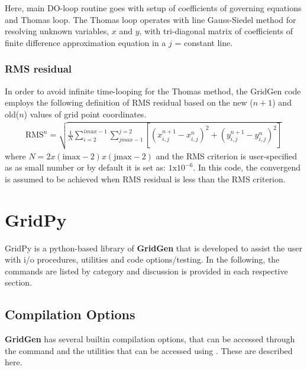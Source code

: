 \documentclass[letterpaper,10pt,english]{sphinxmanual}
\begin{document}
Here, main DO-loop routine goes with setup of coefficients of governing equations and Thomas loop. The Thomas loop operates with line Gauss-Siedel method for resolving unknown variables, \(x\) and \(y\), with tri-diagonal matrix of coefficients of finite difference approximation equation in a \(j\) = constant line.


\subsubsection{RMS residual}
\label{\detokenize{devel:rms-residual}}
In order to avoid infinite time-looping for the Thomas method, the GridGen code employs the following definition of RMS residual based on the new (\(n+1\)) and old(\(n\)) values of grid point coordinates.
\begin{equation*}
\begin{split}\text{RMS}^{n} = \sqrt{\frac{1}{N} \sum_{i=2}^{imax-1} \sum_{jmax-1}^{j=2} \left[\left(x_{i,j}^{n+1} - x_{i,j}^{n} \right)^{2} + \left(y_{i,j}^{n+1} - y_{i,j}^{n} \right)^{2} \right]}\end{split}
\end{equation*}
where \(N = 2x(\text{imax}-2) x (\text{jmax}-2)\) and the RMS criterion is user-specified as as small number or by default it is set as: \(1\text{x}10^{-6}\). In this code, the convergend is assumed to be achieved when RMS residual is less than the RMS criterion.


\section{GridPy}
\label{\detokenize{gridpy::doc}}\label{\detokenize{gridpy:gridpy}}
GridPy is a python-based library of {\color{red}\bfseries{}\textbar{}GridGen\textbar{}} that is developed to assist the user with i/o procedures, utilities and code options/testing. In the following, the commands are listed by category and discussion is provided in each respective section.


\subsection{Compilation Options}
\label{\detokenize{gridpyfiles/compile::doc}}\label{\detokenize{gridpyfiles/compile:compilation-options}}
{\color{red}\bfseries{}\textbar{}GridGen\textbar{}} has several builtin compilation options, that can be accessed through the command  and the  utilities that can be accessed using . These are described here.
\end{document}
